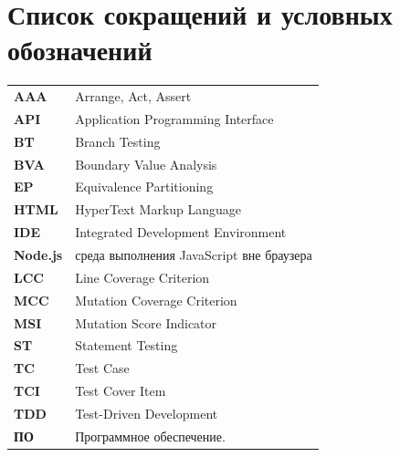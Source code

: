 \chapter*{Список сокращений и условных обозначений}
\noindent
\begin{tabularx}{\textwidth}{>{\bfseries}p{3cm}X}
AAA & Arrange, Act, Assert \\
API & Application Programming Interface \\
BT & Branch Testing \\
BVA & Boundary Value Analysis \\
EP & Equivalence Partitioning \\
HTML & HyperText Markup Language \\
IDE & Integrated Development Environment \\
Node.js & среда выполнения JavaScript вне браузера \\
LCC & Line Coverage Criterion \\
MCC & Mutation Coverage Criterion \\
MSI & Mutation Score Indicator \\
ST & Statement Testing \\
TC & Test Case \\
TCI & Test Cover Item \\
TDD & Test-Driven Development \\
ПО & Программное обеспечение. \\
\end{tabularx}
